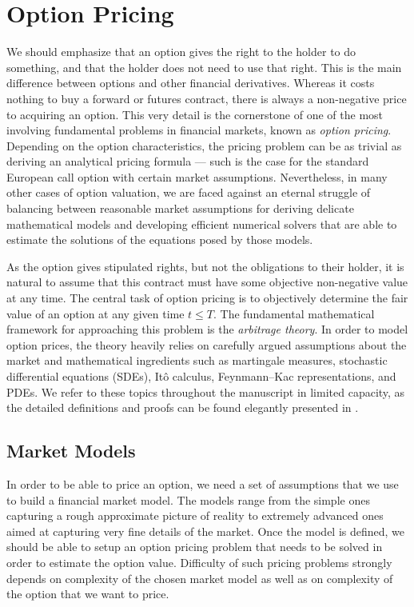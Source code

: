 \documentclass{UUThesisTemplate}
\begin{document}
\chapter{Option Pricing}
\label{ch:optionpricing}
\par We should emphasize that an option gives the right to the holder to do something, and that the holder does not need to use that right. This is the main difference between options and other financial derivatives. Whereas it costs nothing to buy a forward or futures contract, there is always a non-negative price to acquiring an option. This very detail is the cornerstone of one of the most involving fundamental problems in financial markets, known as \emph{option pricing}. Depending on the option characteristics, the pricing problem can be as trivial as deriving an analytical pricing formula --- such is the case for the standard European call option with certain market assumptions. Nevertheless, in many other cases of option valuation, we are faced against an eternal struggle of balancing between reasonable market assumptions for deriving delicate mathematical models and developing efficient numerical solvers that are able to estimate the solutions of the equations posed by those models.
\par As the option gives stipulated rights, but not the obligations to their holder, it is natural to assume that this contract must have some objective non-negative value at any time. The central task of option pricing is to objectively determine the fair value of an option at any given time $t \leq T$. The fundamental mathematical framework for approaching this problem is the \emph{arbitrage theory}. In order to model option prices, the theory heavily relies on carefully argued assumptions about the market and mathematical ingredients such as martingale measures, stochastic differential equations (SDEs), It\^o calculus, Feynmann--Kac representations, and PDEs. We refer to these topics throughout the manuscript in limited capacity, as the detailed definitions and proofs can be found elegantly presented in \cite{bjork2009arbitrage}.
%
\section{Market Models}
\label{sec:models}
\par In order to be able to price an option, we need a set of assumptions that we use to build a financial market model. The models range from the simple ones capturing a rough approximate picture of reality to extremely advanced ones aimed at capturing very fine details of the market. Once the model is defined, we should be able to setup an option pricing problem that needs to be solved in order to estimate the option value. Difficulty of such pricing problems strongly depends on complexity of the chosen market model as well as on complexity of the option that we want to price.  
%
\end{document}
